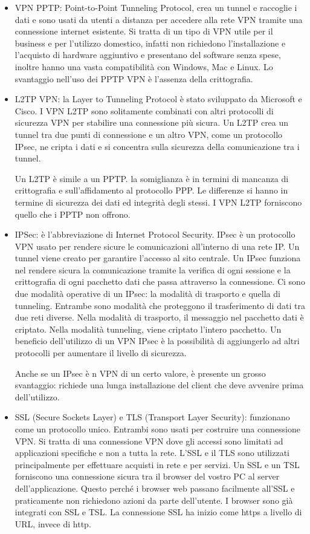 \begin{itemize}
    \item VPN PPTP: Point-to-Point Tunneling Protocol, crea un tunnel e raccoglie i dati e sono usati da utenti a distanza per accedere alla rete VPN tramite una connessione internet esistente. Si tratta di un tipo di VPN utile per il business e per l’utilizzo domestico, infatti non richiedono l’installazione e l’acquisto di hardware aggiuntivo e presentano del software senza spese, inoltre hanno una vasta compatibilità con Windows, Mac e Linux. Lo svantaggio nell’uso dei PPTP VPN è l’assenza della crittografia.
    
    \item L2TP VPN: la Layer to Tunneling Protocol è stato sviluppato da Microsoft e Cisco. I VPN L2TP sono solitamente combinati con altri protocolli di sicurezza VPN per stabilire una connessione più sicura. Un L2TP crea un tunnel tra due punti di connessione e un altro VPN, come un protocollo IPsec, ne cripta i dati e si concentra sulla sicurezza della comunicazione tra i tunnel.
    
    Un L2TP è simile a un PPTP. la somiglianza è in termini di mancanza di crittografia e sull’affidamento al protocollo PPP. Le differenze si hanno in termine di sicurezza dei dati ed integrità degli stessi. I VPN L2TP forniscono quello che i PPTP non offrono.

    \item IPSec: è l’abbreviazione di Internet Protocol Security. IPsec è un protocollo VPN usato per rendere sicure le comunicazioni all’interno di una rete IP. Un tunnel viene creato per garantire l’accesso al sito centrale. Un IPsec funziona nel rendere sicura la comunicazione tramite la verifica di ogni sessione e la crittografia di ogni pacchetto dati che passa attraverso la connessione. Ci sono due modalità operative di un IPsec: la modalità di trasporto e quella di tunneling. Entrambe sono modalità che proteggono il trasferimento di dati tra due reti diverse. Nella modalità di trasporto, il messaggio nel pacchetto dati è criptato. Nella modalità tunneling, viene criptato l’intero pacchetto. Un beneficio dell’utilizzo di un VPN IPsec è la possibilità di aggiungerlo ad altri protocolli per aumentare il livello di sicurezza.
    
    Anche se un IPsec è n VPN di un certo valore, è presente un grosso svantaggio: richiede una lunga installazione del client che deve avvenire prima dell’utilizzo.

    \item SSL (Secure Sockets Layer) e TLS (Transport Layer Security): funzionano come un protocollo unico. Entrambi sono usati per costruire una connessione VPN. Si tratta di una connessione VPN dove gli accessi sono limitati ad applicazioni specifiche e non a tutta la rete. L’SSL e il TLS sono utilizzati principalmente per effettuare acquisti in rete e per servizi. Un SSL e un TSL forniscono una connessione sicura tra il browser del vostro PC al server dell’applicazione. Questo perché i browser web passano facilmente all’SSL e praticamente non richiedono azioni da parte dell’utente. I browser sono già integrati con SSL e TSL. La connessione SSL ha inizio come https a livello di URL, invece di http.
    

\end{itemize}
